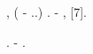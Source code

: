 \documentclass[a4paper]{article}
\begin{document}
{\CYRK} {\cyrs}{\cyro}{\cyrzh}{\cyra}{\cyrl}{\cyre}{\cyrn}{\cyri}{\cyryu},
{\cyrt}{\cyrr}{\cyra}{\cyrd}{\cyri}{\cyrc}{\cyri}{\cyro}{\cyrn}{\cyrn}{\cyrery}{\cyre}
{\cyrt}{\cyre}{\cyrh}{\cyrn}{\cyri}{\cyrk}{\cyri}
{\cyrk}{\cyro}{\cyrm}{\cyrp}{\cyrsftsn}{\cyryu}{\cyrt}{\cyre}{\cyrr}{\cyrn}{\cyro}{\cyrg}{\cyro}
{\cyrr}{\cyra}{\cyrs}{\cyrch}{\cyre}{\cyrt}{\cyra} {\cyra}{\cyrt}{\cyro}{\cyrm}{\cyrn}{\cyrery}{\cyrh}
{\cyrs}{\cyri}{\cyrs}{\cyrt}{\cyre}{\cyrm} ({\cyrr}{\cyre}{\cyrsh}{\cyre}{\cyrn}{\cyri}{\cyrya}
{\cyru}{\cyrr}{\cyra}{\cyrv}{\cyrn}{\cyre}{\cyrn}{\cyri}{\cyrishrt}
{\CYRH}{\cyra}{\cyrr}{\cyrt}{\cyrr}{\cyri}-{\CYRF}{\cyro}{\cyrk}{\cyrk}{\cyra} {\cyri} {\cyrt}.{\cyrd}.)
{\cyrya}{\cyrv}{\cyrl}{\cyrya}{\cyryu}{\cyrt}{\cyrs}{\cyrya}
{\cyrn}{\cyre}{\cyrerev}{\cyrf}{\cyrf}{\cyre}{\cyrk}{\cyrt}{\cyri}{\cyrv}{\cyrn}{\cyrery}{\cyrm}{\cyri}
{\cyrd}{\cyrl}{\cyrya} {\cyrr}{\cyra}{\cyrs}{\cyrch}{\cyre}{\cyrt}{\cyra}
{\cyrs}{\cyrp}{\cyre}{\cyrk}{\cyrt}{\cyrr}{\cyra} {\cyri} {\cyrv}{\cyro}{\cyrl}{\cyrn}{\cyro}{\cyrv}{\cyrery}{\cyrh}
{\cyrf}{\cyru}{\cyrn}{\cyrk}{\cyrc}{\cyri}{\cyrishrt}
{\cyrv}{\cyrery}{\cyrs}{\cyro}{\cyrk}{\cyro}{\cyrv}{\cyro}{\cyrz}{\cyrb}{\cyru}{\cyrzh}{\cyrd}{\cyre}{\cyrn}{\cyrn}{\cyrery}{\cyrh}
{\cyrs}{\cyro}{\cyrs}{\cyrt}{\cyro}{\cyrya}{\cyrn}{\cyri}{\cyrishrt}. {\CYRI}{\cyrz}-{\cyrz}{\cyra}
{\cyrerev}{\cyrt}{\cyro}{\cyrg}{\cyro} {\cyrn}{\cyre}{\cyro}{\cyrb}{\cyrh}{\cyro}{\cyrd}{\cyri}{\cyrm}{\cyro}
{\cyrp}{\cyro}{\cyrl}{\cyrsftsn}{\cyrz}{\cyro}{\cyrv}{\cyra}{\cyrt}{\cyrsftsn}{\cyrs}{\cyrya}
{\cyrt}{\cyre}{\cyrh}{\cyrn}{\cyri}{\cyrk}{\cyro}{\cyrishrt},
{\cyro}{\cyrs}{\cyrn}{\cyro}{\cyrv}{\cyra}{\cyrn}{\cyrn}{\cyro}{\cyrishrt} {\cyrn}{\cyra}
{\cyrm}{\cyre}{\cyrt}{\cyro}{\cyrd}{\cyre} {\cyrk}{\cyrv}{\cyra}{\cyrn}{\cyrt}{\cyro}{\cyrv}{\cyro}{\cyrg}{\cyro}
{\cyrd}{\cyre}{\cyrf}{\cyre}{\cyrk}{\cyrt}{\cyra}[7].

{\CYRL}{\cyra}{\cyrz}{\cyre}{\cyrr}{\cyrn}{\cyra}{\cyrya} {\cyra}{\cyrb}{\cyrl}{\cyrya}{\cyrc}{\cyri}{\cyrya} {\cyrv}
{\cyrm}{\cyre}{\cyrt}{\cyra}{\cyrl}{\cyrl}{\cyra}{\cyrh} {\cyrn}{\cyre}{\cyrd}{\cyra}{\cyrv}{\cyrn}{\cyro}
{\cyrs}{\cyrd}{\cyre}{\cyrl}{\cyra}{\cyrl}{\cyra} {\cyrv}{\cyro}{\cyrz}{\cyrm}{\cyro}{\cyrzh}{\cyrn}{\cyrery}{\cyrm}
{\cyrp}{\cyro}{\cyrg}{\cyrr}{\cyru}{\cyrzh}{\cyre}{\cyrn}{\cyri}{\cyre} {\cyra}{\cyrt}{\cyro}{\cyrm}{\cyro}{\cyrv}
{\cyrr}{\cyra}{\cyrz}{\cyrl}{\cyri}{\cyrch}{\cyrn}{\cyrery}{\cyrh}
{\cyrm}{\cyre}{\cyrt}{\cyra}{\cyrl}{\cyrl}{\cyro}{\cyrv} {\cyri}
{\cyrn}{\cyre}{\cyrb}{\cyro}{\cyrl}{\cyrsftsn}{\cyrsh}{\cyri}{\cyrh}
{\cyrk}{\cyrl}{\cyra}{\cyrs}{\cyrt}{\cyre}{\cyrr}{\cyro}{\cyrv} {\cyrt}{\cyra}{\cyrk}{\cyri}{\cyrh}
{\cyra}{\cyrt}{\cyro}{\cyrm}{\cyro}{\cyrv} {\cyrv} {\cyrg}{\cyre}{\cyrl}{\cyri}{\cyre}{\cyrv}{\cyrery}{\cyre}
{\cyrn}{\cyra}{\cyrn}{\cyro}{\cyrk}{\cyra}{\cyrp}{\cyrl}{\cyri}. {\CYRI}{\cyrh}
{\cyrs}{\cyrp}{\cyre}{\cyrk}{\cyrt}{\cyrr}{\cyrery}
{\cyro}{\cyrp}{\cyrr}{\cyre}{\cyrd}{\cyre}{\cyrl}{\cyrya}{\cyryu}{\cyrt}{\cyrs}{\cyrya} {\cyrs}
{\cyri}{\cyrs}{\cyrp}{\cyro}{\cyrl}{\cyrsftsn}{\cyrz}{\cyro}{\cyrv}{\cyra}{\cyrn}{\cyri}{\cyre}{\cyrm}
{\cyrl}{\cyra}{\cyrz}{\cyre}{\cyrr}{\cyrn}{\cyro}-{\cyri}{\cyrn}{\cyrd}{\cyru}{\cyrc}{\cyri}{\cyrr}{\cyro}{\cyrv}{\cyra}{\cyrn}{\cyrn}{\cyro}{\cyrishrt}
{\cyrf}{\cyrl}{\cyryu}{\cyro}{\cyrr}{\cyre}{\cyrs}{\cyrc}{\cyre}{\cyrn}{\cyrc}{\cyri}{\cyri}. 
\end{document}

